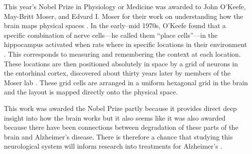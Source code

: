 \documentclass[12pt]{article}
\begin{document}
This year's Nobel Prize in Physiology or Medicine was awarded to John O'Keefe,
May-Britt Moser, and Edvard I. Moser for their work on understanding how the
brain maps physical spaces \cite{press,nyt}.
In the early--mid 1970s, O'Keefe found that a specific combination of nerve
cells---he called them ``place cells''---in the hippocampus activated when
rats where in specific locations in their environment \cite{nobel1a, nobel1b}.
This corresponds to measuring and remembering the context at each location.
These locations are then positioned absolutely in space by a grid of neurons
in the entorhinal cortex, discovered about thirty years later by members of
the Moser lab \cite{nobel2a, nobel2b, nobel2c}.
These grid cells are arranged in a uniform hexagonal grid in the brain and the
layout is mapped directly onto the physical space.

This work was awarded the Nobel Prize partly because it provides direct deep
insight into how the brain works but it also seems like it was also awarded
because there have been connections between degradation of these parts of the
brain and Alzheimer's disease.
There is therefore a chance that studying this neurological system will inform
research into treatments for Alzheimer's \cite{press}.


{}

\end{document}
